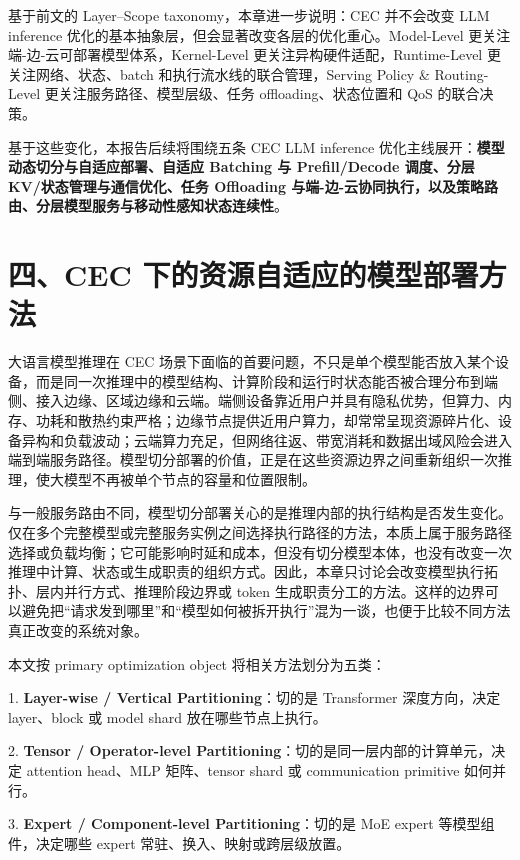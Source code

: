 \documentclass[a4paper,10pt]{ctexart}
\begin{document}
基于前文的 Layer–Scope taxonomy，本章进一步说明：CEC 并不会改变 LLM inference 优化的基本抽象层，但会显著改变各层的优化重心。Model-Level 更关注端-边-云可部署模型体系，Kernel-Level 更关注异构硬件适配，Runtime-Level 更关注网络、状态、batch 和执行流水线的联合管理，Serving Policy \& Routing-Level 更关注服务路径、模型层级、任务 offloading、状态位置和 QoS 的联合决策。




基于这些变化，本报告后续将围绕五条 CEC LLM inference 优化主线展开：\textbf{模型动态切分与自适应部署、自适应 Batching 与 Prefill/Decode 调度、分层 KV/状态管理与通信优化、任务 Offloading 与端-边-云协同执行，以及策略路由、分层模型服务与移动性感知状态连续性}。


\section*{四、CEC 下的资源自适应的模型部署方法}

大语言模型推理在 CEC 场景下面临的首要问题，不只是单个模型能否放入某个设备，而是同一次推理中的模型结构、计算阶段和运行时状态能否被合理分布到端侧、接入边缘、区域边缘和云端。端侧设备靠近用户并具有隐私优势，但算力、内存、功耗和散热约束严格；边缘节点提供近用户算力，却常常呈现资源碎片化、设备异构和负载波动；云端算力充足，但网络往返、带宽消耗和数据出域风险会进入端到端服务路径。模型切分部署的价值，正是在这些资源边界之间重新组织一次推理，使大模型不再被单个节点的容量和位置限制。


与一般服务路由不同，模型切分部署关心的是推理内部的执行结构是否发生变化。仅在多个完整模型或完整服务实例之间选择执行路径的方法，本质上属于服务路径选择或负载均衡；它可能影响时延和成本，但没有切分模型本体，也没有改变一次推理中计算、状态或生成职责的组织方式。因此，本章只讨论会改变模型执行拓扑、层内并行方式、推理阶段边界或 token 生成职责分工的方法。这样的边界可以避免把“请求发到哪里”和“模型如何被拆开执行”混为一谈，也便于比较不同方法真正改变的系统对象。


本文按 primary optimization object 将相关方法划分为五类：


1. \textbf{Layer-wise / Vertical Partitioning}：切的是 Transformer 深度方向，决定 layer、block 或 model shard 放在哪些节点上执行。


2. \textbf{Tensor / Operator-level Partitioning}：切的是同一层内部的计算单元，决定 attention head、MLP 矩阵、tensor shard 或 communication primitive 如何并行。


3. \textbf{Expert / Component-level Partitioning}：切的是 MoE expert 等模型组件，决定哪些 expert 常驻、换入、映射或跨层级放置。
\end{document}
